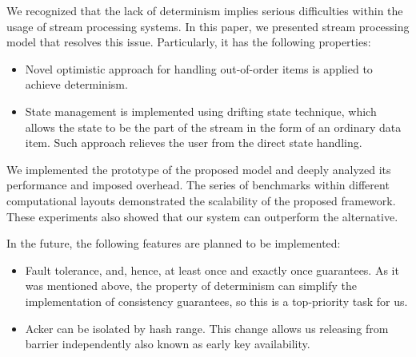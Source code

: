 
\label {fs-conclusions}

We recognized that the lack of determinism implies serious difficulties within the usage of stream processing systems. In this paper, we presented stream processing model that resolves this issue. Particularly, it has the following properties:

\begin{itemize}
    \item Novel optimistic approach for handling out-of-order items is applied to achieve determinism.
    \item State management is implemented using drifting state technique, which allows the state to be the part of the stream in the form of an ordinary data item. Such approach relieves the user from the direct state handling.
\end{itemize}

We implemented the prototype of the proposed model and deeply analyzed its performance and imposed overhead. The series of benchmarks within different computational layouts demonstrated the scalability of the proposed framework. These experiments also showed that our system can outperform the alternative.

In the future, the following features are planned to be implemented:
\begin{itemize}
    \item Fault tolerance, and, hence, at least once and exactly once guarantees. As it was mentioned above, the property of determinism can simplify the implementation of consistency guarantees, so this is a top-priority task for us.
    \item Acker can be isolated by hash range. This change allows us releasing from barrier independently also known as early key availability.
\end{itemize}
